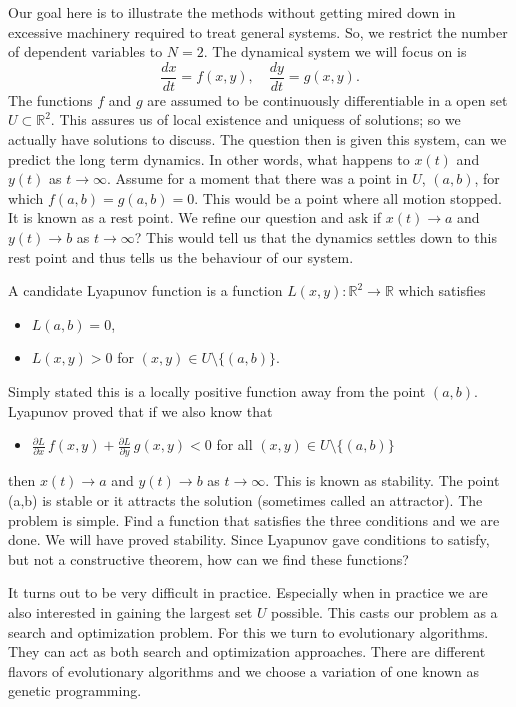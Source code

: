 \documentclass[12pt]{article}
\def      \RR             {{\mathbb R}}
\begin{document}
Our goal here is to illustrate the methods without getting mired down
in excessive machinery required to treat general systems.  So, we
restrict the number of dependent variables to $N=2$.  The dynamical
system we will focus on is
$$\frac{dx}{dt} = f(x,y), \quad \frac{dy}{dt} = g(x,y).$$
The functions $f$ and $g$ are assumed to be continuously
differentiable in a open set $U \subset {\RR}^2$.  This assures us of
local existence and uniquess of solutions; so we actually have
solutions to discuss.  The question then is given this system, can we
predict the long term dynamics.  In other words, what happens to
$x(t)$ and $y(t)$ as $t \to \infty$.  Assume for a moment that there
was a point in $U$, $(a,b)$, for which $f(a,b) = g(a,b)=0$.  This
would be a point where all motion stopped.  It is known as a rest
point.  We refine our question and ask if $x(t)\to a$ and $y(t)\to b$
as $t \to \infty$?  This would tell us that the dynamics settles down
to this rest point and thus tells us the behaviour of our system.   

A candidate Lyapunov function is a function $L(x,y): {\RR}^2\to {\RR}$
which satisfies
\begin{itemize}
\item $L(a,b) = 0$,
\item  $L(x,y) > 0$ for $(x,y) \in U\setminus \{(a,b)\}$.
\end{itemize}
Simply stated this is a locally positive function away from the point
$(a,b)$.  Lyapunov proved that if we also know that 
\begin{itemize}
\item $\displaystyle \frac{\partial L}{\partial x}\, f(x,y) 
+ \frac{\partial L}{\partial y}\, g(x,y) < 0$ for all $(x,y) \in
U\setminus \{(a,b)\}$
\end{itemize}
then $x(t)\to a$ and $y(t)\to b$ as $t \to \infty$.  This is known as
stability.  The point (a,b) is stable or it attracts the solution
(sometimes called an attractor).  The problem is simple.  Find a
function that satisfies the three conditions and we are done. We will
have proved stability.   Since Lyapunov gave conditions to satisfy,
but not a constructive theorem, how can we find these functions?   

It turns out to be very difficult in practice.  Especially when in
practice we are also interested in gaining the largest set $U$
possible.  This casts our problem as a search and optimization
problem.  For this we turn to evolutionary algorithms.  They can act
as both search and optimization approaches.   There are different
flavors of evolutionary algorithms and we choose a variation of one
known as genetic programming.
 
\end{document}

